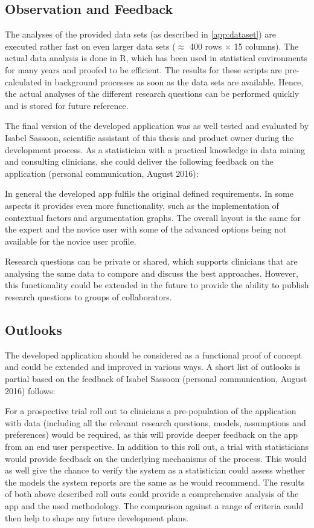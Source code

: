 \subsection{Observation and Feedback}
\sloppy

The analyses of the provided data sets (as described in \autoref{app:dataset}) are executed rather fast on even larger data sets ($\approx$ 400 rows $\times$ 15 columns). The actual data analysis is done in \gls{R}, which has been used in statistical environments for many years and proofed to be efficient. The results for these scripts are pre-calculated in background processes as soon as the data sets are available. Hence, the actual analyses of the different research questions can be performed quickly and is stored for future reference.

The final version of the developed application was as well tested and evaluated by Isabel Sassoon, scientific assistant of this thesis and product owner during the development process. As a statistician with a practical knowledge in data mining and consulting clinicians, she could deliver the following feedback on the application (personal communication, August 2016):

In general the developed app fulfils the original defined requirements. In some aspects it provides even more functionality, such as the implementation of contextual factors and argumentation graphs. The overall layout is the same for the expert and the novice user with some of the advanced options being not available for the novice user profile.

Research questions can be private or shared, which supports clinicians that are analysing the same data to compare and discuss the best approaches. However, this functionality could be extended in the future to provide the ability to publish research questions to groups of collaborators.


\subsection{Outlooks}
\label{sub:outlooks}

The developed application should be considered as a functional proof of concept and could be extended and improved in various ways. A short list of outlooks is partial based on the feedback of Isabel Sassoon (personal communication, August 2016) follows:

For a prospective trial roll out to clinicians a pre-population of the application with data (including  all the relevant research questions, models, assumptions and preferences) would be required, as this will provide deeper feedback on the app from an end user perspective. In addition to this roll out, a trial with statisticians would provide feedback on the underlying mechanisms of the process. This would as well give the chance to verify the system as a statistician could assess whether the models the system reports are the same as he would recommend. The results of both above described roll outs could provide a comprehensive analysis of the app and the used methodology. The comparison against a range of criteria could then help to shape any future development plans.

